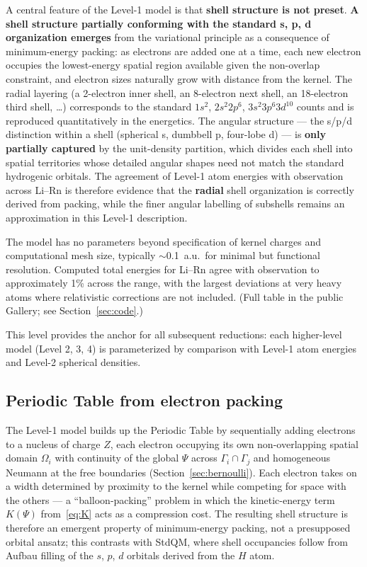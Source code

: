 \documentclass[11pt]{article}
\begin{document}
A central feature of the Level-1 model is that \textbf{shell structure is not preset}. \textbf{A shell structure partially conforming with the standard s, p, d organization emerges} from the variational principle as a consequence of minimum-energy packing: as electrons are added one at a time, each new electron occupies the lowest-energy spatial region available given the non-overlap constraint, and electron sizes naturally grow with distance from the kernel. The radial layering (a 2-electron inner shell, an 8-electron next shell, an 18-electron third shell, \ldots) corresponds to the standard $1s^2$, $2s^2 2p^6$, $3s^2 3p^6 3d^{10}$ counts and is reproduced quantitatively in the energetics. The angular structure --- the s/p/d distinction within a shell (spherical s, dumbbell p, four-lobe d) --- is \textbf{only partially captured} by the unit-density partition, which divides each shell into spatial territories whose detailed angular shapes need not match the standard hydrogenic orbitals. The agreement of Level-1 atom energies with observation across Li--Rn is therefore evidence that the \textbf{radial} shell organization is correctly derived from packing, while the finer angular labelling of subshells remains an approximation in this Level-1 description.

The model has no parameters beyond specification of kernel charges and computational mesh size, typically $\sim$0.1~a.u.\ for minimal but functional resolution. Computed total energies for Li--Rn agree with observation to approximately 1\% across the range, with the largest deviations at very heavy atoms where relativistic corrections are not included. (Full table in the public Gallery; see Section~\ref{sec:code}.)

This level provides the anchor for all subsequent reductions: each higher-level model (Level 2, 3, 4) is parameterized by comparison with Level-1 atom energies and Level-2 spherical densities.

\subsection{Periodic Table from electron packing}\label{sec:pt-packing}

The Level-1 model builds up the Periodic Table by sequentially adding electrons to a nucleus of charge $Z$, each electron occupying its own non-overlapping spatial domain $\Omega_i$ with continuity of the global $\Psi$ across $\Gamma_i \cap \Gamma_j$ and homogeneous Neumann at the free boundaries (Section~\ref{sec:bernoulli}). Each electron takes on a width determined by proximity to the kernel while competing for space with the others --- a ``balloon-packing'' problem in which the kinetic-energy term $K(\Psi)$ from~\eqref{eq:K} acts as a compression cost. The resulting shell structure is therefore an emergent property of minimum-energy packing, not a presupposed orbital ansatz; this contrasts with StdQM, where shell occupancies follow from Aufbau filling of the $s$, $p$, $d$ orbitals derived from the $H$ atom.
\end{document}

